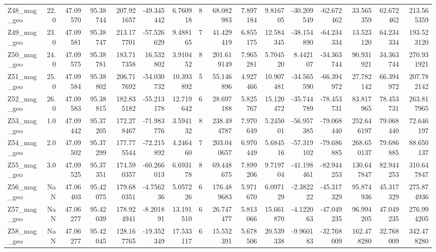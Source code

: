 \documentclass[11pt]{article}
\begin{document}
\begin{sidewaystable}
{\begin{tabular}{lrrrrrrrrrrrrrrr}
Z48\_mag\_geo &       22.0 &  47.09570 &  95.38744 &  207.921657 & -49.345442 &   6.760918 &   8 &   68.082983 &  7.897184 &   9.816705 &     -30.209549 & -62.672462 &   33.565359 &    62.672462 &   213.565359 \\
Z49\_mag\_geo &       23.0 &  47.09581 &  95.38747 &  213.177701 & -57.526629 &   9.488165 &   7 &   41.429419 &  6.855175 &  12.584345 &     -38.154890 & -64.234334 &   13.523120 &    64.234334 &   193.523120 \\
Z50\_mag\_geo &       24.0 &  47.09575 &  95.38781 &  183.717358 &  16.532802 &   3.910452 &   8 &  201.619149 &  7.965281 &   5.704520 &       8.442107 & -34.363744 &   90.931921 &    34.363744 &   270.931921 \\
Z51\_mag\_geo &       25.0 &  47.09584 &  95.38802 &  206.717692 & -54.030732 &  10.393892 &   5 &   55.146896 &  4.927466 &  10.907481 &     -34.565590 & -66.394972 &   27.782142 &    66.394972 &   207.782142 \\
Z52\_mag\_geo &       26.0 &  47.09583 &  95.38815 &  182.835182 & -55.213178 &  12.719642 &   6 &   28.697188 &  5.825767 &  15.120472 &     -35.744789 & -78.453731 &   83.817965 &    78.453731 &   263.817965 \\
Z53\_mag\_geo &        1.0 &  47.09442 &  95.37205 &  172.278467 & -71.983776 &   3.594132 &   8 &  238.494787 &  7.970649 &   5.245001 &     -56.957385 & -79.068440 &  252.646197 &    79.068440 &    72.646197 \\
Z54\_mag\_geo &        2.0 &  47.09502 &  95.37299 &  177.775544 & -72.215892 &   4.246460 &   7 &  203.040657 &  6.970449 &   5.684516 &     -57.319102 & -79.686885 &  268.650137 &    79.686885 &    88.650137 \\
Z55\_mag\_geo &        3.0 &  47.09525 &  95.37351 &  174.590357 & -60.266013 &   6.693178 &   8 &   69.448675 &  7.899206 &   9.719704 &     -41.198461 & -82.944253 &  130.647847 &    82.944253 &   310.647847 \\
Z56\_mag\_geo &        NaN &  47.06403 &  95.42075 &  179.680351 &  -4.756236 &   5.057226 &   6 &  176.489683 &  5.971670 &   6.097129 &      -2.382222 & -45.317329 &   95.874936 &    45.317329 &   275.874936 \\
Z57\_mag\_geo &        NaN &  47.06277 &  95.42039 &  178.924941 &  -8.201891 &  13.191510 &   6 &   26.747477 &  5.813066 &  15.661870 &      -4.122063 & -47.049235 &   96.994205 &    47.049235 &   276.994205 \\
Z58\_mag\_geo &        NaN &  47.06277 &  95.42045 &  128.167765 & -19.352349 &  17.533117 &   6 &   15.552391 &  5.678506 &  20.539338 &      -9.960183 & -32.768009 &  162.478280 &    32.768009 &   342.478280 \\
\bottomrule
\end{tabular}}
\end{sidewaystable}
    
\end{document}
